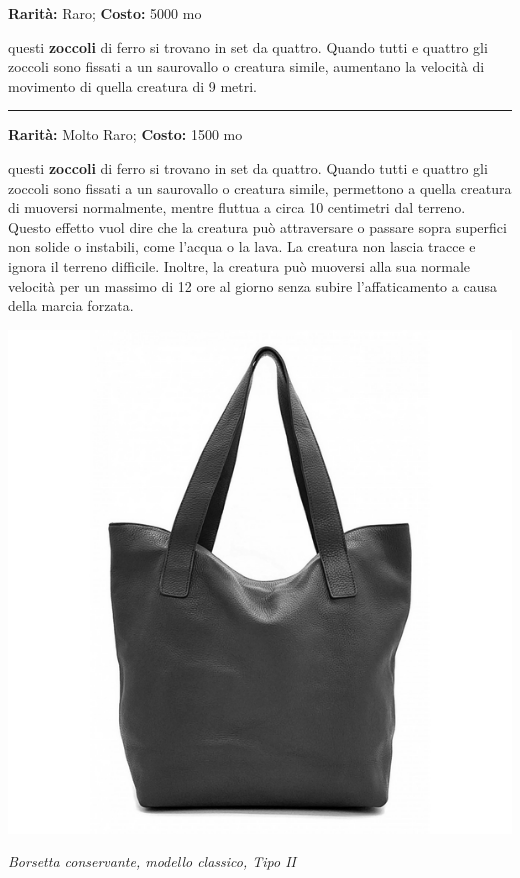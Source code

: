 \begin{multicols}{2}
\textbf{Rarità:} Raro; \textbf{Costo:} 5000 mo

questi \textbf{zoccoli} di ferro si trovano in set da quattro. Quando tutti e quattro gli zoccoli sono fissati a un saurovallo o creatura simile, aumentano la velocità di movimento di quella creatura di 9 metri.

\smallskip\noindent\rule{\linewidth}{2pt}  \hypertarget{ZoccolidelloZefiro}{}\smallskip{}\noindent\label{ZoccolidelloZefiro}

\textbf{Rarità:} Molto Raro; \textbf{Costo:} 1500 mo

questi \textbf{zoccoli} di ferro si trovano in set da quattro. Quando tutti e quattro gli zoccoli sono fissati a un saurovallo o creatura simile, permettono a quella creatura di muoversi normalmente, mentre fluttua a circa 10 centimetri dal terreno. Questo effetto vuol dire che la creatura può attraversare o passare sopra superfici non solide o instabili, come l'acqua o la lava. La creatura non lascia tracce e ignora il terreno difficile. Inoltre, la creatura può muoversi alla sua normale velocità per un massimo di 12 ore al giorno senza subire l'affaticamento a causa della marcia forzata.

\end{multicols}

\vfill
\begin{center}
\includegraphics[width=0.6\linewidth]{immagini/borsetta.png}

\emph{Borsetta conservante, modello classico, Tipo II}



\end{center}

\pagebreak


